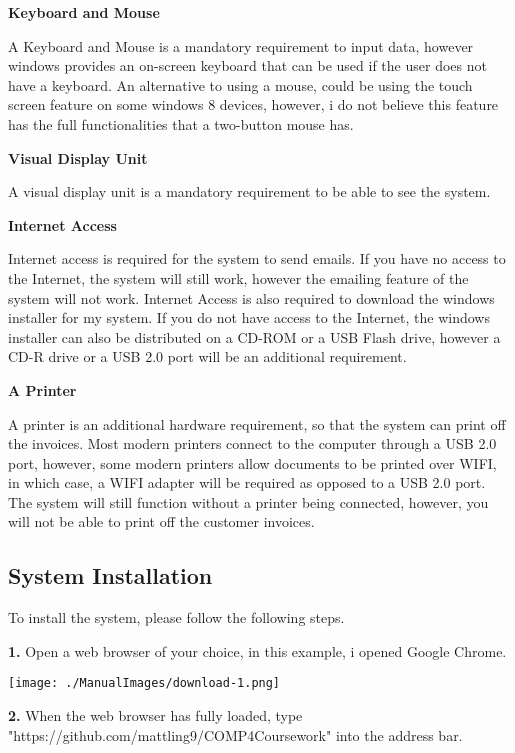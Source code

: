 \textbf{Keyboard and Mouse}

A Keyboard and Mouse is a mandatory requirement to input data, however windows provides an on-screen keyboard that can be used if the user does not have a keyboard. An alternative to using a mouse, could be using the touch screen feature on some windows 8 devices, however, i do not believe this feature has the full functionalities that a two-button mouse has.

\textbf{Visual Display Unit}

A visual display unit is a mandatory requirement to be able to see the system.

\textbf{Internet Access}

Internet access is required for the system to send emails. If you have no access to the Internet, the system will still work, however the emailing feature of the system will not work. Internet Access is also required to download the windows installer for my system. If you do not have access to the Internet, the windows installer can also be distributed on a CD-ROM or a USB Flash drive, however a CD-R drive or a USB 2.0 port will be an additional requirement.

\pagebreak

\textbf{A Printer}

A printer is an additional hardware requirement, so that the system can print off the invoices. Most modern printers connect to the computer through a USB 2.0 port, however, some modern printers allow documents to be printed over WIFI, in which case, a WIFI adapter will be required as opposed to a USB 2.0 port. The system will still function without a printer being connected, however, you will not be able to print off the customer invoices.

\pagebreak
\subsection{System Installation}
\label{fig:System Installation}

To install the system, please follow the following steps.

\textbf{1.} Open a web browser of your choice, in this example, i opened Google Chrome.

\texttt{[image: ./ManualImages/download-1.png]}

\vspace{5mm}

\textbf{2.} When the web browser has fully loaded, type \newline "https://github.com/mattling9/COMP4Coursework" into the address bar.

